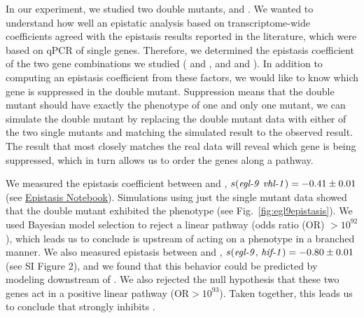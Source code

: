 In our experiment, we studied two double mutants, \eglhif{} and \eglvhl{}. We
wanted to understand how well an epistatic analysis based on transcriptome-wide
coefficients agreed with the epistasis results reported in the literature, which
were based on qPCR of single genes. Therefore, we determined the epistasis
coefficient of the two gene combinations we studied ( and
, and  and ). In addition to computing an
epistasis coefficient from these factors, we would like to know which gene is
suppressed in the double mutant. Suppression means that the double mutant
should have exactly the phenotype of one and only one mutant, we can simulate
the double mutant by replacing the double mutant data with either of the two
single mutants and matching the simulated result to the observed result. The
result that most closely matches the real data will reveal which gene is being
suppressed, which in turn allows us to order the genes along a pathway.

We measured the epistasis coefficient between  and ,
$s({\text{\mbox{\emph{egl-9}} \mbox{\emph{vhl-1}}}}) = -0.41\pm 0.01$ (see
\href{https://wormlabcaltech.github.io/mprsq/analysis_notebooks/6_epistasis.html}
{Epistasis Notebook}). Simulations using just the single mutant data showed that
the double mutant exhibited the \egl{} phenotype (see
Fig.~\ref{fig:egl9epistasis}). We used Bayesian model selection to reject a
linear pathway (odds ratio (OR) $>10^{92}$), which leads us to conclude
 is upstream of  acting on a phenotype in a branched
manner. We also measured epistasis between  and ,
$s({\text{\mbox{\emph{egl-9}}, \mbox{\emph{hif-1}}}}) = -0.80\pm0.01$ (see SI Figure 2), and
we found that this behavior could be predicted by modeling 
downstream of . We also rejected the null hypothesis that these two
genes act in a positive linear pathway (OR$> 10^{93}$). Taken together, this
leads us to conclude that  strongly inhibits .

